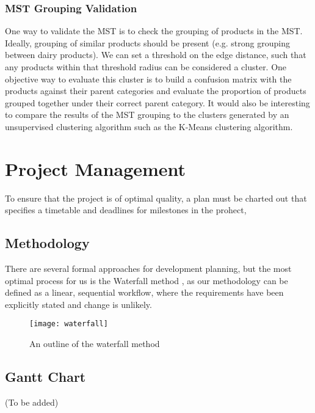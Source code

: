 \documentclass[a4paper,11pt]{article}
\begin{document}
\subsubsection*{MST Grouping Validation}
One way to validate the MST is to check the grouping of products in the MST. Ideally,  grouping of similar products should be present (e.g. strong grouping between dairy products). We can set a threshold on the edge distance, such that any products within that threshold radius can be considered a cluster.  One objective way to evaluate this cluster is to build a confusion matrix with the products against their parent categories and evaluate the proportion of products grouped together under their correct parent category. It would also be interesting to compare the results of the MST grouping to the clusters generated by an unsupervised clustering algorithm such as the K-Means clustering algorithm.

\newpage
\section{Project Management}
To ensure that the project is of optimal quality,  a plan must be charted out that specifies a timetable and deadlines for milestones in the prohect,
\subsection{Methodology}
There are several formal approaches for development planning,  but the most optimal process for us is the Waterfall method \cite{waterfall}, as our methodology can be defined as a linear, sequential workflow, where the requirements have been explicitly stated and change is unlikely.
\begin{figure}[H]
\centering
\texttt{[image: waterfall]}
\caption{An outline of the waterfall method}\label{fig:waterfall}
\end{figure}

\subsection{Gantt Chart}
(To be added)
\end{document}
